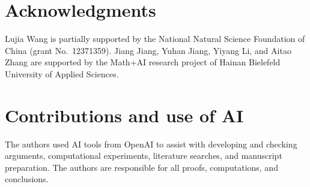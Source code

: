 \documentclass[11pt,reqno]{amsart}
\numberwithin{equation}{section}
\theoremstyle{definition}
\theoremstyle{remark}
\begin{document}
\section*{Acknowledgments}

Lujia Wang is partially supported by the National Natural Science
Foundation of China (grant No.~12371359). Jiang Jiang, Yuhan Jiang,
Yiyang Li, and Aitao Zhang are
supported by the Math+AI research project of Hainan Bielefeld University
of Applied Sciences.

\section*{Contributions and use of AI}

The authors used AI tools from OpenAI to assist with developing and
checking arguments, computational experiments, literature searches,
and manuscript preparation.
The authors are responsible for all proofs, computations, and conclusions.
\end{document}
